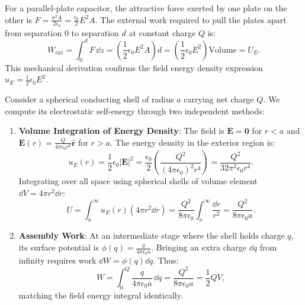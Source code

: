 \begin{remark}
For a parallel-plate capacitor, the attractive force exerted by one plate on the other is \(F = \frac{\sigma^2 A}{2\epsilon_0} = \frac{\epsilon_0}{2}E^2 A\). The external work required to pull the plates apart from separation $0$ to separation \(d\) at constant charge \(Q\) is:
\begin{equation}
    W_{\text{ext}} = \int_0^d F\,\dd{z} = \left(\frac{1}{2}\epsilon_0 E^2 A\right) d = \left(\frac{1}{2}\epsilon_0 E^2\right) \text{Volume} = U_E.
\end{equation}
This mechanical derivation confirms the field energy density expression \(u_E = \frac{1}{2}\epsilon_0 E^2\).
\end{remark}

\begin{example}
Consider a spherical conducting shell of radius \(a\) carrying net charge \(Q\). We compute its electrostatic self-energy through two independent methods:
\begin{enumerate}
    \item \textbf{Volume Integration of Energy Density}:
    The field is \(\bm{E} = \bm{0}\) for \(r < a\) and \(\bm{E}(r) = \frac{Q}{4\pi\epsilon_0 r^2}\hat{\bm{r}}\) for \(r > a\). The energy density in the exterior region is:
    \begin{equation}
        u_E(r) = \frac{1}{2}\epsilon_0 |\bm{E}|^2 = \frac{\epsilon_0}{2}\left(\frac{Q^2}{(4\pi\epsilon_0)^2 r^4}\right) = \frac{Q^2}{32\pi^2\epsilon_0 r^4}.
    \end{equation}
    Integrating over all space using spherical shells of volume element \(\dd{V} = 4\pi r^2 \dd{r}\):
    \begin{equation}
        U = \int_a^\infty u_E(r)(4\pi r^2 \dd{r}) = \frac{Q^2}{8\pi\epsilon_0}\int_a^\infty \frac{\dd{r}}{r^2} = \frac{Q^2}{8\pi\epsilon_0 a}.
    \end{equation}
    \item \textbf{Assembly Work}:
    At an intermediate stage where the shell holds charge \(q\), its surface potential is \(\phi(q) = \frac{q}{4\pi\epsilon_0 a}\). Bringing an extra charge \(\dd{q}\) from infinity requires work \(\dd{W} = \phi(q)\dd{q}\). Thus:
    \begin{equation}
        W = \int_0^Q \frac{q}{4\pi\epsilon_0 a}\,\dd{q} = \frac{Q^2}{8\pi\epsilon_0 a} = \frac{1}{2} Q V,
    \end{equation}
    matching the field energy integral identically.
\end{enumerate}
\end{example}

